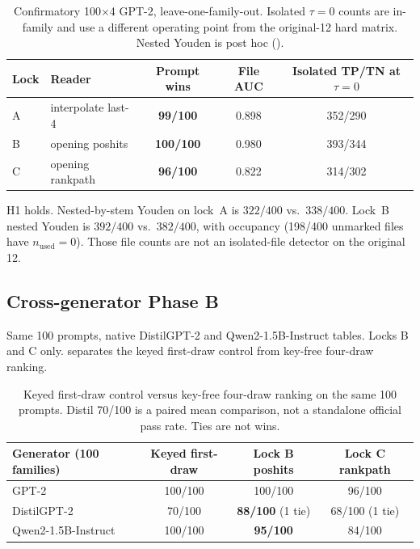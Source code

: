 \documentclass[11pt,a4paper]{article}
\theoremstyle{definition}
\begin{document}
\begin{table}[t]
\centering
\small
\caption{Confirmatory 100$\times$4 GPT-2, leave-one-family-out.
Isolated $\tau=0$ counts are in-family and use a different operating
point from the original-12 hard matrix. Nested Youden is post hoc
().}
\label{tab:lock}
\begin{tabular}{l l c c c}
\toprule
Lock & Reader & Prompt wins & File AUC & Isolated TP/TN at $\tau=0$ \\
\midrule
A & interpolate last-4 & \textbf{99/100} & 0.898 & 352/290 \\
B & opening poshits    & \textbf{100/100} & 0.980 & 393/344 \\
C & opening rankpath   & \textbf{96/100} & 0.822 & 314/302 \\
\bottomrule
\end{tabular}
\end{table}

H1 holds. Nested-by-stem Youden on lock~A is $322/400$ vs.\ $338/400$.
Lock~B nested Youden is $392/400$ vs.\ $382/400$, with occupancy
(198/400 unmarked files have $n_{\mathrm{used}}=0$). Those file counts
are not an isolated-file detector on the original 12.

\subsection{Cross-generator Phase B}
\label{sec:h3}

Same 100 prompts, native DistilGPT-2 and Qwen2-1.5B-Instruct tables.
Locks B and C only.  separates the keyed first-draw
control from key-free four-draw ranking.

\begin{table}[t]
\centering
\small
\caption{Keyed first-draw control versus key-free four-draw ranking on
the same 100 prompts. Distil 70/100 is a paired mean comparison, not a
standalone official pass rate. Ties are not wins.}
\label{tab:cross}
\begin{tabular}{l c c c}
\toprule
Generator (100 families) & Keyed first-draw & Lock B poshits & Lock C rankpath \\
\midrule
GPT-2               & 100/100 & 100/100 & 96/100 \\
DistilGPT-2         & 70/100  & \textbf{88/100} (1 tie) & 68/100 (1 tie) \\
Qwen2-1.5B-Instruct & 100/100 & \textbf{95/100} & 84/100 \\
\bottomrule
\end{tabular}
\end{table}
\end{document}
